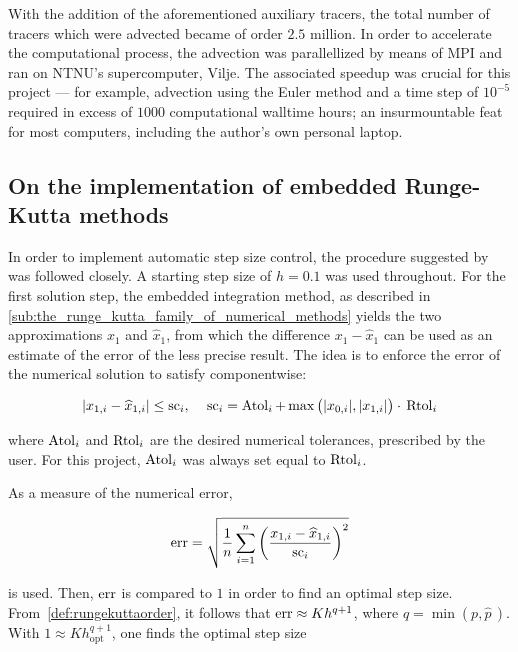 With the addition of the aforementioned auxiliary tracers, the total number
of tracers which were advected became of order $2.5$ million. In order to
accelerate the computational process, the advection was parallellized by means
of MPI and ran on NTNU's supercomputer, Vilje. The associated speedup was
crucial for this project --- for example, advection using the Euler method
and a time step of $10^{-5}$ required in excess of $1000$ computational
walltime hours; an insurmountable feat for most computers, including the
author's own personal laptop.

\subsection{On the implementation of embedded Runge-Kutta methods}
\label{sub:on_the_implementation_of_embedded_runge_kutta_methods}

In order to implement automatic step size control, the procedure suggested
by \textcite[pp.167--168]{hairer1993solving} was followed
closely. A starting step size of $h=0.1$ was used throughout. For the first
solution step, the embedded integration method, as described in
\cref{sub:the_runge_kutta_family_of_numerical_methods} yields the two
approximations $x_{1}$ and $\widehat{x}_{1}$, from which the difference
$x_{1}-\widehat{x}_{1}$ can be used as an estimate of the error of the less
precise result. The idea is to enforce the error of the numerical solution to
satisfy componentwise:

\begin{equation}
    \label{eq:embeddederror}
    \abs{x_{1,i}-\widehat{x}_{1,i}} \leq \scem_{i},\quad{}%
    \scem_{i}=\atol_{i}+\max\big(\abs{x_{0,i}},\abs{x_{1,i}}\big)\cdot{}\rtol_{i}
\end{equation}

where $\operatorname{Atol}_{i}$ and $\operatorname{Rtol}_{i}$ are the desired numerical tolerances, prescribed
by the user. For this project, $\operatorname{Atol}_{i}$ was always set equal to $\operatorname{Rtol}_{i}$.

As a measure of the numerical error,

\begin{equation}
    \label{eq:embeddednumericalerror}
    \errem = \sqrt{\frac{1}{n}\sum\limits_{i=1}^{n}%
    {\bigg(\frac{x_{1,i}-\widehat{x}_{1,i}}{\scem_{i}}\bigg)}^{2}}
\end{equation}

is used. Then, $\operatorname{err}$ is compared to $1$ in order to find an optimal step
size. From~\cref{def:rungekuttaorder}, it follows that $\operatorname{err}\approx{}Kh^{q+1}$,
where $q=\min(p,\widehat{p}\,)$. With $1\approx{}Kh_{\mathrm{opt}}^{q+1}$,
one finds the optimal step size


